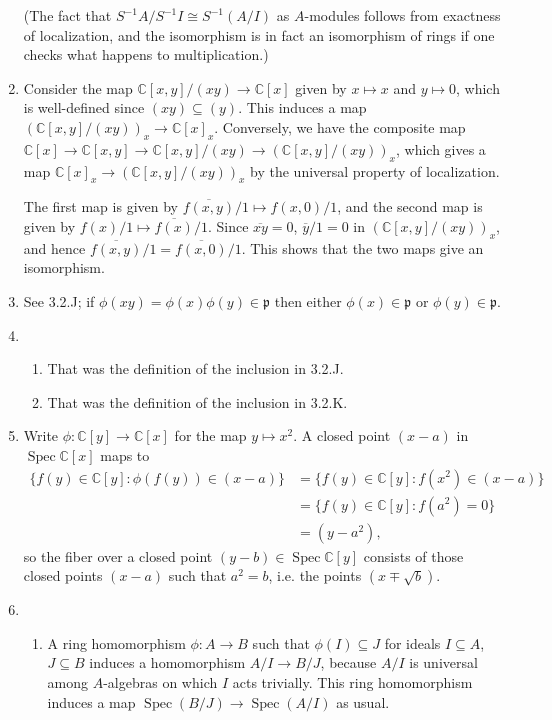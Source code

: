 \documentclass{report}
\newcommand{\eqclass}[1]{\overline{#1}} %
\newcommand{\p}{\mathfrak{p}}
\newcommand{\C}{\mathbb{C}}
\DeclareMathOperator{\Spec}{Spec}
\begin{document}
\begin{enumerate}[label=\textbf{3.2.\Alph*.}]
	      (The fact that $S^{-1}A/S^{-1}I\cong S^{-1}(A/I)$ as $A$-modules
	      follows from exactness of localization, and the isomorphism is in fact
	      an isomorphism of rings if one checks what happens to multiplication.)

	\item Consider the map $\C[x,y]/(xy)\to\C[x]$ given by $x\mapsto x$ and
	      $y\mapsto0$, which is well-defined since $(xy)\subseteq(y)$. This
	      induces a map $(\C[x,y]/(xy))_x\to\C[x]_x$. Conversely, we have the
	      composite map $\C[x]\to\C[x,y]\to\C[x,y]/(xy)\to(\C[x,y]/(xy))_x$,
	      which gives a map $\C[x]_x\to(\C[x,y]/(xy))_x$ by the universal
	      property of localization.

	      The first map is given by $\eqclass{f(x,y)}/1\mapsto f(x,0)/1$, and the
	      second map is given by $f(x)/1\mapsto\eqclass{f(x)}/1$. Since
	      $\eqclass{xy}=0$, $\eqclass{y}/1=0$ in $(\C[x,y]/(xy))_x$, and hence
	      $\eqclass{f(x,y)}/1=\eqclass{f(x,0)}/1$. This shows that the two maps give
	      an isomorphism.

	\item See 3.2.J; if $\phi(xy)=\phi(x)\phi(y)\in\p$ then either
	      $\phi(x)\in\p$ or $\phi(y)\in\p$.

	\item
	      \begin{enumerate}[label=(\alph*)]
		      \item That was the definition of the inclusion in 3.2.J.
		      \item That was the definition of the inclusion in 3.2.K.
	      \end{enumerate}

	\item Write $\phi:\C[y]\to\C[x]$ for the map $y\mapsto x^2$. A closed
	      point $(x-a)$ in $\Spec\C[x]$ maps to
	      \begin{align*}
		      \{f(y)\in\C[y]:\phi(f(y))\in(x-a)\}
		       & = \{f(y)\in\C[y]:f(x^2)\in(x-a)\} \\
		       & = \{f(y)\in\C[y]:f(a^2)=0\}       \\
		       & = (y-a^2),
	      \end{align*}
	      so the fiber over a closed point $(y-b)\in\Spec\C[y]$ consists of
	      those closed points $(x-a)$ such that $a^2=b$, i.e. the points
	      $(x\mp\sqrt b)$.

	\item
	      \begin{enumerate}[label=(\alph*)]
		      \item A ring homomorphism $\phi:A\to B$ such that
		            $\phi(I)\subseteq J$ for ideals $I\subseteq A$, $J\subseteq B$
		            induces a homomorphism $A/I\to B/J$, because $A/I$ is
		            universal among $A$-algebras on which $I$ acts trivially. This
		            ring homomorphism induces a map $\Spec(B/J)\to\Spec(A/I)$ as
		            usual.


\end{enumerate}
\end{enumerate}
\end{document}
